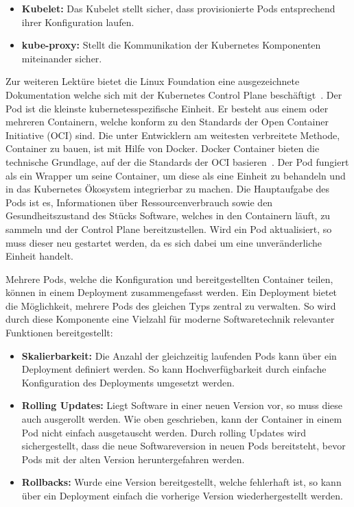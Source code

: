 \begin{itemize}
    \item \textbf{Kubelet:} Das Kubelet stellt sicher, dass provisionierte Pods entsprechend ihrer Konfiguration laufen.
    \item \textbf{kube-proxy:} Stellt die Kommunikation der Kubernetes Komponenten miteinander sicher.
\end{itemize}
Zur weiteren Lektüre bietet die Linux Foundation eine ausgezeichnete Dokumentation welche sich mit der Kubernetes Control Plane beschäftigt~\cite{kubernetescomponents}.
Der Pod ist die kleinste kubernetesspezifische Einheit.
Er besteht aus einem oder mehreren Containern, welche konform zu den Standards der Open Container Initiative (OCI) sind.
Die unter Entwicklern am weitesten verbreitete Methode, Container zu bauen, ist mit Hilfe von Docker.
Docker Container bieten die technische Grundlage, auf der die Standards der OCI basieren~\cite{opencontainerinitiative}.
Der Pod fungiert als ein Wrapper um seine Container, um diese als eine Einheit zu behandeln und in das Kubernetes Ökosystem integrierbar zu machen.
Die Hauptaufgabe des Pods ist es, Informationen über Ressourcenverbrauch sowie den Gesundheitszustand des Stücks Software, welches in den Containern läuft, zu sammeln und der Control Plane bereitzustellen.
Wird ein Pod aktualisiert, so muss dieser neu gestartet werden, da es sich dabei um eine unveränderliche Einheit handelt.

Mehrere Pods, welche die Konfiguration und bereitgestellten Container teilen, können in einem Deployment zusammengefasst werden.
Ein Deployment bietet die Möglichkeit, mehrere Pods des gleichen Typs zentral zu verwalten.
So wird durch diese Komponente eine Vielzahl für moderne Softwaretechnik relevanter Funktionen bereitgestellt:

\begin{itemize}
    \item \textbf{Skalierbarkeit:} Die Anzahl der gleichzeitig laufenden Pods kann über ein Deployment definiert werden.
    So kann Hochverfügbarkeit durch einfache Konfiguration des Deployments umgesetzt werden.
    \item \textbf{Rolling Updates:} Liegt Software in einer neuen Version vor, so muss diese auch ausgerollt werden.
    Wie oben geschrieben, kann der Container in einem Pod nicht einfach ausgetauscht werden.
    Durch rolling Updates wird sichergestellt, dass die neue Softwareversion in neuen Pods bereitsteht, bevor Pods mit der alten Version heruntergefahren werden.
    \item \textbf{Rollbacks:} Wurde eine Version bereitgestellt, welche fehlerhaft ist, so kann über ein Deployment einfach die vorherige Version wiederhergestellt werden.
\end{itemize}

